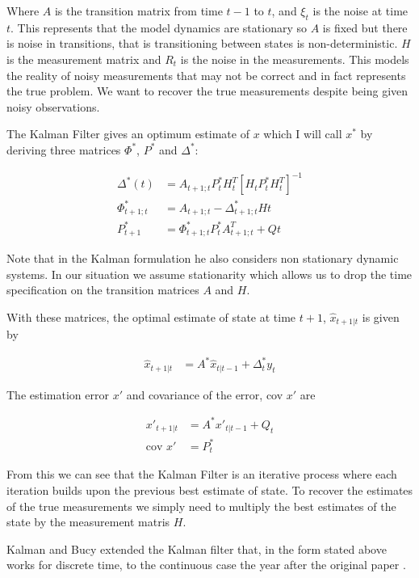\documentclass[]{../resources/final_report}
\begin{document}
Where $A$ is the transition matrix from time $t-1$ to $t$, and $\xi_t$ is the noise at time $t$. 
This represents that the model dynamics are stationary so $A$ is fixed but there is noise in 
transitions, that is transitioning between states is non-deterministic. $H$ is the measurement 
matrix and $R_t$ is the noise in the measurements. This models the reality of noisy measurements 
that may not be correct and in fact represents the true problem. We want to recover the true 
measurements despite being given noisy observations.

The Kalman Filter gives an optimum estimate of $x$ which I will call $x^*$ by deriving three matrices 
$\Phi^*$, $P^*$ and $\Delta^*$:

\begin{align}
  \Delta^*(t) &= A_{t+1;t}P^*_tH^T_t[H_tP^*_tH^T_t]^{-1} \\
  \Phi^*_{t+1;t} &= A_{t+1;t} - \Delta^*_{t+1;t}H{t} \\
  P^*_{t+1} &= \Phi^*_{t+1;t}P^*_tA^T_{t+1;t} + Q{t}
\end{align}


Note that in the Kalman formulation he also considers non stationary dynamic systems. In our 
situation we assume stationarity which allows us to drop the time specification on the transition 
matrices $A$ and $H$.

With these matrices, the optimal estimate of state at time $t+1$, $\hat{x}_{t+1|t}$ is given by 

\begin{align}
  \hat{x}_{t+1|t} &= A^*\hat{x}_{t|t-1} + \Delta^*_ty_t
\end{align}

The estimation error $x'$ and covariance of the error, cov $x'$ are

\begin{align}
  x'_{t+1|t} &= A^*x'_{t|t-1} + Q_t \\
  \text{cov } x' &= P^*_t
\end{align}

From this we can see that the Kalman Filter is an iterative process where each iteration builds upon 
the previous best estimate of state. To recover the estimates of the true measurements we simply 
need to multiply the best estimates of the state by the measurement matris $H$.

Kalman and Bucy extended the Kalman filter that, in the form stated above works for discrete time, to the 
continuous case the year after the original paper \cite{Klmn1961NewRI}.
\end{document}
